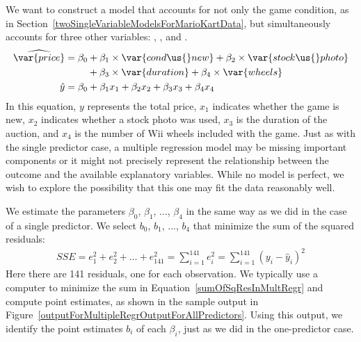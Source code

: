 We want to construct a model that accounts for not only the game condition, as in Section~\ref{twoSingleVariableModelsForMarioKartData}, but simultaneously accounts for three other variables: , , and .
\begin{align}
\widehat{\var{price}}
	&= \beta_0 + \beta_1\times \var{cond\us{}new} +
		\beta_2\times \var{stock\us{}photo} \notag \\
	&\qquad\  + \beta_3 \times  \var{duration} +
		\beta_4 \times  \var{wheels} \notag \\
\hat{y}
	&= \beta_0 + \beta_1 x_1 + \beta_2 x_2 +
		\beta_3 x_3 + \beta_4 x_4
\label{eqForMultipleRegrOfTotalPrForAllPredictors}
\end{align}
In this equation, $y$ represents the total price, $x_1$ indicates whether the game is new, $x_2$ indicates whether a stock photo was used, $x_3$ is the duration of the auction, and $x_4$ is the number of Wii wheels included with the game. Just as with the single predictor case, a multiple regression model may be missing important components or it might not precisely represent the relationship between the outcome and the available explanatory variables. While no model is perfect, we wish to explore the possibility that this one may fit the data reasonably well.

We estimate the parameters $\beta_0$, $\beta_1$, ..., $\beta_4$ in the same way as we did in the case of a single predictor. We select $b_0$, $b_1$, ..., $b_4$ that minimize the sum of the squared residuals:
\begin{align}\label{sumOfSqResInMultRegr}
SSE = e_1^2 + e_2^2 + \dots + e_{141}^2
	= \sum_{i=1}^{141} e_i^2
	 = \sum_{i=1}^{141} \left(y_i - \hat{y}_i\right)^2
\end{align}
Here there are 141 residuals, one for each observation. We typically use a computer to minimize the sum in Equation~\eqref{sumOfSqResInMultRegr} and compute point estimates, as shown in the sample output in Figure~\ref{outputForMultipleRegrOutputForAllPredictors}. Using this output, we identify the point estimates $b_i$ of each $\beta_i$, just as we did in the one-predictor case.

